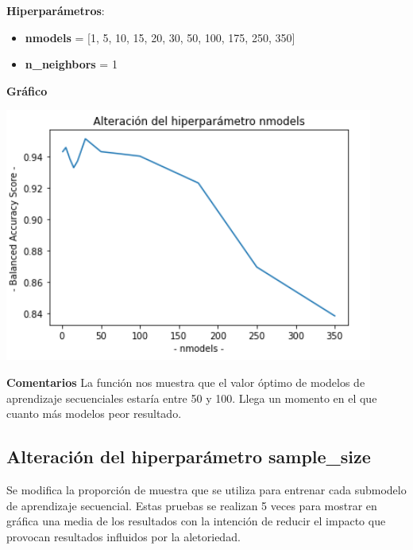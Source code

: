 \documentclass[conference,a4paper]{IEEEtran}
\begin{document}
\begin{textb}
    \textbf{Hiperparámetros}:
  \begin{itemize}
      \item \textbf{nmodels} = [1, 5, 10, 15, 20, 30, 50, 100, 175, 250, 350]
      \item \textbf{n\_neighbors} = 1
  \end{itemize}
  \textbf{Gráfico}
  
  \begin{center}
    \includegraphics[scale=0.80]{figures/nmodels_BreastCancerDataset_knn.png}
    \label{fig:funcion_clasificacion}
  \end{center}
  
  \textbf{Comentarios} La función nos muestra que el valor óptimo de modelos de aprendizaje secuenciales estaría entre 50 y 100. Llega un momento en el que cuanto más modelos peor resultado.
\end{textb}

\subsection{Alteración del hiperparámetro sample\_size}

Se modifica la proporción de muestra que se utiliza para entrenar cada submodelo de aprendizaje secuencial. Estas pruebas se realizan 5 veces para mostrar en gráfica una media de los resultados con la intención de reducir el impacto que provocan resultados influidos por la aletoriedad.
\end{document}
